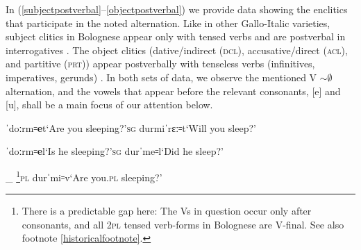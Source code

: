 \documentclass[output=paper,colorlinks,citecolor=brown]{langscibook}
\begin{document}
In (\ref{subjectpostverbal}--\ref{objectpostverbal}) we provide data showing the enclitics that participate in the noted alternation. Like in other Gallo-Italic varieties, subject clitics in Bolognese appear only with tensed verbs and are postverbal in interrogatives . The object clitics (dative/indirect (\textsc{dcl}), accusative/direct (\textsc{acl}), and partitive (\textsc{prt})) appear postverbally with tenseless verbs (infinitives, imperatives, gerunds) . In both sets of data, we observe the mentioned V $\sim\emptyset$ alternation, and the vowels that appear before the relevant consonants, [e] and [u], shall be a main focus of our attention below.

\begin{exe}
		\ex \label{subjectpostverbal}
			\begin{xlist}
				\ex 
                    \begin{xlisti}
                       \ex ˈdoːrm꞊\textbf{e}t\tab `Are you sleeping?'\textsc{sg}
                       \ex durmiˈrɛː꞊t\tab `Will you sleep?'\tab
                    \end{xlisti}

                \ex  \begin{xlisti}
                       \ex ˈdoːrm꞊\textbf{e}l\tab `Is he sleeping?'\textsc{sg}
                       \ex durˈme꞊l\tab `Did he sleep?'
                    \end{xlisti}

                \ex \begin{xlisti}
                    \ex \_ \footnote{There is a predictable gap here: The Vs in question occur only after consonants, and all 2\textsc{pl} tensed verb-forms in Bolognese are V-final. See also footnote \ref{historicalfootnote}.}\tab {}\textsc{pl}
                    \ex durˈmi꞊v\tab `Are you.\textsc{pl} sleeping?'
                \end{xlisti}
			\end{xlist}
\end{exe}
\end{document}
